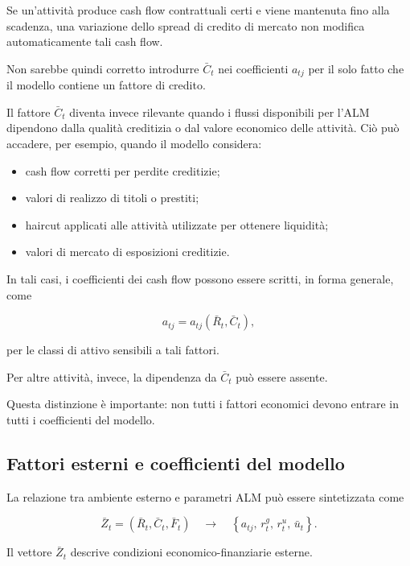 Se un'attivit\`a produce cash flow contrattuali certi e viene mantenuta fino
alla scadenza, una variazione dello spread di credito di mercato non modifica
automaticamente tali cash flow.

Non sarebbe quindi corretto introdurre $\bar{C}_t$ nei coefficienti
$a_{tj}$ per il solo fatto che il modello contiene un fattore di credito.

Il fattore $\bar{C}_t$ diventa invece rilevante quando i flussi disponibili
per l'ALM dipendono dalla qualit\`a creditizia o dal valore economico delle
attivit\`a. Ci\`o pu\`o accadere, per esempio, quando il modello considera:

\begin{itemize}

\item cash flow corretti per perdite creditizie;

\item valori di realizzo di titoli o prestiti;

\item haircut applicati alle attivit\`a utilizzate per ottenere liquidit\`a;

\item valori di mercato di esposizioni creditizie.

\end{itemize}

In tali casi, i coefficienti dei cash flow possono essere scritti, in forma
generale, come

\[
a_{tj}
=
a_{tj}
\left(
\bar{R}_t,\bar{C}_t
\right),
\]

\noindent per le classi di attivo sensibili a tali fattori.

Per altre attivit\`a, invece, la dipendenza da $\bar{C}_t$ pu\`o essere
assente.

Questa distinzione \`e importante: non tutti i fattori economici devono
entrare in tutti i coefficienti del modello.

\subsection{Fattori esterni e coefficienti del modello}

La relazione tra ambiente esterno e parametri ALM pu\`o essere sintetizzata
come

\[
\bar{Z}_t
=
(\bar{R}_t,\bar{C}_t,\bar{F}_t)
\quad\longrightarrow\quad
\left\{
a_{tj},\,
r^g_t,\,
r^u_t,\,
\bar{u}_t
\right\}.
\]

Il vettore $\bar{Z}_t$ descrive condizioni economico-finanziarie esterne.


